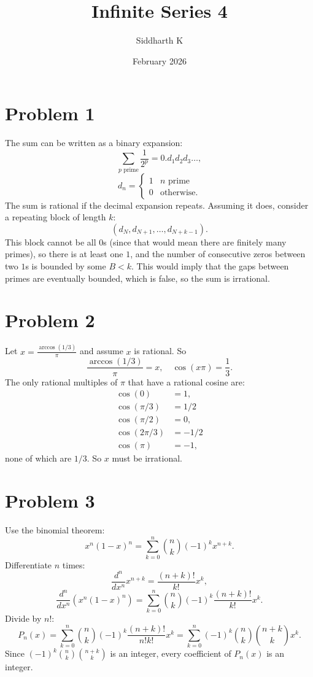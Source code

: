 \documentclass{article}
\title{Infinite Series 4}
\author{Siddharth K}
\date{February 2026}
\begin{document}
\maketitle

\section*{Problem 1}

The sum can be written as a binary expansion:
$$\sum_{p \text{ prime}} \frac{1}{2^p} = 0.d_1d_2d_3\ldots,$$
$$d_n = \begin{cases}
    1 & n\text{ prime} \\
    0 & \text{otherwise}.
\end{cases}$$
The sum is rational if the decimal expansion repeats. Assuming it does, consider a repeating block of length $k$:
$$(d_N, d_{N + 1}, \ldots, d_{N + k - 1}).$$
This block cannot be all $0$s (since that would mean there are finitely many primes), so there is at least one $1$, and the number of consecutive zeros between two $1$s is bounded by some $B < k$. This would imply that the gaps between primes are eventually bounded, which is false, so the sum is irrational.

\section*{Problem 2}

Let $x = \frac{\arccos(1/3)}{\pi}$ and assume $x$ is rational. So
$$\frac{\arccos(1/3)}{\pi} = x,\quad \cos(x\pi) = \frac{1}{3}.$$
The only rational multiples of $\pi$ that have a rational cosine are:
\begin{align*}
    \cos(0) &= 1,\\
    \cos(\pi/3) &= 1/2 \\
    \cos(\pi/2) &= 0,\\
    \cos(2\pi/3) &= -1/2 \\
    \cos(\pi) &= -1,
\end{align*}
none of which are $1/3$. So $x$ must be irrational.

\section*{Problem 3}
Use the binomial theorem:
$$x^n(1 - x)^n = \sum_{k = 0}^n \binom{n}{k}(-1)^kx^{n + k}.$$
Differentiate $n$ times:
$$\frac{d^n}{dx^n}x^{n + k} = \frac{(n + k)!}{k!}x^k,$$
$$\frac{d^n}{dx^n}(x^n(1 - x)^n) = \sum_{k = 0}^n \binom nk (-1)^k \frac{(n + k)!}{k!}x^k.$$
Divide by $n!$:
$$P_n(x) = \sum_{k = 0}^n \binom nk (-1)^k \frac{(n + k)!}{n!k!}x^k = \sum_{k = 0}^n (-1)^k\binom nk \binom{n + k}{k} x^k.$$
Since $(-1)^k\binom nk \binom{n + k}{k}$ is an integer, every coefficient of $P_n(x)$ is an integer.
\end{document}
